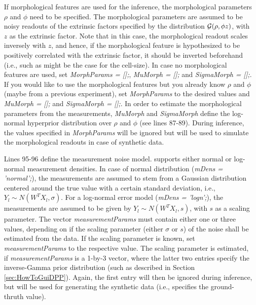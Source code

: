 \documentclass[a4paper, 9pt]{scrartcl}
\begin{document}
If morphological features are used for the inference, the morphological parameters $\rho$ and $\phi$ need to be specified. The morphological parameters are assumed to be noisy readouts of the extrinsic factors specified by the distribution $\mathcal{G}(\rho, \phi z)$, with $z$ as the extrinsic factor. Note that in this case, the morphological readout scales inversely with $z$, and hence, if the morphological feature is hypothesized to be positively correlated with the extrinsic factor, it should be inverted beforehand (i.e., such as might be the case for the cell-size). In case no morphological features are used, set \textit{MorphParams = [];}, \textit{MuMorph = [];} and \textit{SigmaMorph = [];}. If you would like to use the morphological features but you already know $\rho$ and $\phi$ (maybe from a previous experiment), set \textit{MorphParams} to the desired values and \textit{MuMorph = [];} and \textit{SigmaMorph = [];}. In order to estimate the morphological parameters from the measurements, \textit{MuMorph} and \textit{SigmaMorph} define the log-normal hyperprior distribution over $\rho$ and $\phi$ (see lines 87-89). During inference, the values specified in \textit{MorphParams} will be ignored but will be used to simulate the morphological readouts in case of synthetic data. \newline

Lines 95-96 define the measurement noise model. \DPP supports either normal or log-normal measurement densities. In case of normal distribution (\textit{mDens = 'normal';}), the measurements are assumed to stem from a Gaussian distribution centered around the true value with a certain standard deviation, i.e., $Y_{l} \sim N(W^{T} X_{l}, \sigma)$. For a log-normal error model (\textit{mDens = 'logn';}), the measurements are assumed to be given by $Y_{l} \sim N(W^{T} X_{l}, s)$, with $s$ as a scaling parameter. The vector \textit{measurementParams} must contain either one or three values, depending on if the scaling parameter (either $\sigma$ or $s$) of the noise shall be estimated from the data. If the scaling parameter is known, set \textit{measurementParams} to the respective value. The scaling parameter is estimated, if \textit{measurementParams} is a 1-by-3 vector, where the latter two entries specify the inverse-Gamma prior distribution (such as described in Section \ref{sec:HowToGuiDPP}). Again, the first entry will then be ignored during inference, but will be used for generating the synthetic data (i.e., specifies the ground-thruth value). \newline
\end{document}
